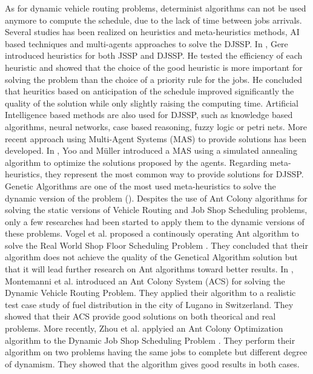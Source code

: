 \documentclass[a4paper,10pt]{article}
\begin{document}
As for dynamic vehicle routing problems, determinist algorithms can not be used anymore to compute the schedule, due to the lack of time between jobs arrivals. Several studies has been realized on heuristics and meta-heuristics methods, AI based techniques and multi-agents approaches to solve the DJSSP.
In \cite{Gere1966}, Gere introduced heuristics for both JSSP and DJSSP. He tested the efficiency of each heuristic and showed that the choice of the good heuristic is more important for solving the problem than the choice of a priority rule for the jobs. He concluded that heuritics based on anticipation of the schedule improved significantly the quality of the solution while only slightly raising the computing time.
Artificial Intelligence based methods are also used for DJSSP, such as knowledge based algorithms, neural networks, case based reasoning, fuzzy logic or petri nets.
More recent approach using Multi-Agent Systems (MAS) to provide solutions has been developed. In \cite{Yoo2002}, Yoo and M\"{u}ller introduced a MAS using a simulated annealing algorithm to optimize the solutions proposed by the agents.
Regarding meta-heuristics, they represent the most common way to provide solutions for DJSSP. Genetic Algorithms are one of the most used meta-heuristics to solve the dynamic version of the problem (\cite{Lin1997, Qi2000}).
Despites the use of Ant Colony algorithms for solving the static versions of Vehicle Routing and Job Shop Scheduling problems, only a few researches had been started to apply them to the dynamic versions of these problems. Vogel et al. proposed a continously operating Ant algorithm to solve the Real World Shop Floor Scheduling Problem \cite{Vogel2002}. They concluded that their algorithm does not achieve the quality of the Genetical Algorithm solution but that it will lead further research on Ant algorithms toward better results.
In \cite{Montemanni2005}, Montemanni et al. introduced an Ant Colony System (ACS) for solving the Dynamic Vehicle Routing Problem. They applied their algorithm to a realistic test case study of fuel distribution in the city of Lugano in Switzerland. They showed that their ACS provide good solutions on both theorical and real problems.
More recently, Zhou et al. applyied an Ant Colony Optimization algorithm to the Dynamic Job Shop Scheduling Problem \cite{Zhou2008}. They perform their algorithm on two problems having the same jobs to complete but different degree of dynamism. They showed that the algorithm gives good results in both cases.
\end{document}
